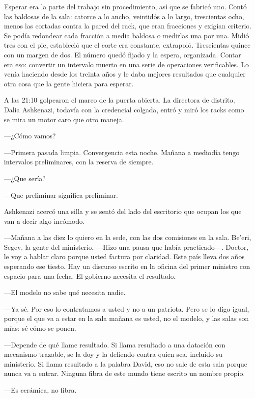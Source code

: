 Esperar era la parte del trabajo sin procedimiento, así que se fabricó uno. Contó las baldosas de la sala: catorce a lo ancho, veintidós a lo largo, trescientas ocho, menos las cortadas contra la pared del rack, que eran fracciones y exigían criterio. Se podía redondear cada fracción a media baldosa o medirlas una por una. Midió tres con el pie, estableció que el corte era constante, extrapoló. Trescientas quince con un margen de dos. El número quedó fijado y la espera, organizada. Contar era eso: convertir un intervalo muerto en una serie de operaciones verificables. Lo venía haciendo desde los treinta años y le daba mejores resultados que cualquier otra cosa que la gente hiciera para esperar.

A las 21:10 golpearon el marco de la puerta abierta. La directora de distrito, Dalia Ashkenazi, todavía con la credencial colgada, entró y miró los racks como se mira un motor caro que otro maneja.

---¿Cómo vamos?

---Primera pasada limpia. Convergencia esta noche. Mañana a mediodía tengo intervalos preliminares, con la reserva de siempre.

---¿Que sería?

---Que preliminar significa preliminar.

Ashkenazi acercó una silla y se sentó del lado del escritorio que ocupan los que van a decir algo incómodo.

---Mañana a las diez lo quiero en la sede, con las dos comisiones en la sala. Be'eri, Segev, la gente del ministerio. ---Hizo una pausa que había practicado---. Doctor, le voy a hablar claro porque usted factura por claridad. Este país lleva dos años esperando ese tiesto. Hay un discurso escrito en la oficina del primer ministro con espacio para una fecha. El gobierno necesita el resultado.

---El modelo no sabe qué necesita nadie.

---Ya sé. Por eso lo contratamos a usted y no a un patriota. Pero se lo digo igual, porque el que va a estar en la sala mañana es usted, no el modelo, y las salas son mías: sé cómo se ponen.

---Depende de qué llame resultado. Si llama resultado a una datación con mecanismo trazable, se la doy y la defiendo contra quien sea, incluido su ministerio. Si llama resultado a la palabra David, eso no sale de esta sala porque nunca va a entrar. Ninguna fibra de este mundo tiene escrito un nombre propio.

---Es cerámica, no fibra.

